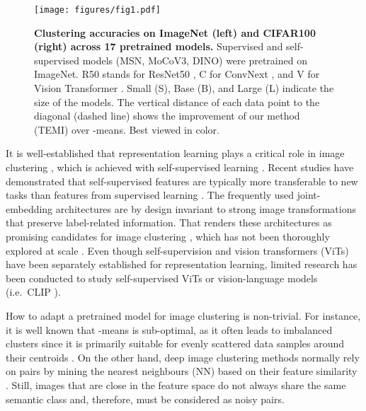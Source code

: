 \documentclass{bmvc2k}
\begin{document}
\begin{figure*}[t]
\begin{center}
\texttt{[image: figures/fig1.pdf]}
\end{center}
\caption{
\textbf{Clustering accuracies on ImageNet (left) and CIFAR100 (right) across 17 pretrained models.} Supervised and self-supervised models (MSN, MoCoV3, DINO) were pretrained on ImageNet. R50 stands for ResNet50 \cite{resnet}, C for ConvNext \cite{convnext}, and V for Vision Transformer \cite{vit}. Small (S), Base (B), and Large (L) indicate the size of the models. The vertical distance of each data point to the diagonal (dashed line) shows the improvement of our method (TEMI) over -means. Best viewed in color.} 
\label{fig:main}
\end{figure*}

 
It is well-established that representation learning plays a critical role in image clustering \cite{chang2017deep}, which is achieved with self-supervised learning \cite{simclr, moco,zbontar2021barlow,byol}. Recent studies have demonstrated that self-supervised features are typically more transferable to new tasks than features from supervised learning \cite{ericsson2021ssltranfer}. The frequently used joint-embedding architectures \cite{byol,dino} are by design invariant to strong image transformations that preserve label-related information. That renders these architectures as promising candidates for image clustering \cite{scan}, which has not been thoroughly explored at scale \cite{tsp}. Even though self-supervision \cite{ericsson2021ssltranfer} and vision transformers (ViTs) \cite{naseer2021intriguing} have been separately established for representation learning, limited research has been conducted to study self-supervised ViTs or vision-language models (i.e.\ CLIP \cite{radford2021clip}).

How to adapt a pretrained model for image clustering is non-trivial. For instance, it is well known that -means is sub-optimal, as it often leads to imbalanced clusters \cite{scan} since it is primarily suitable for evenly scattered data samples around their centroids \cite{yang2017towards}. On the other hand, deep image clustering methods normally rely on pairs by mining the nearest neighbours (NN) based on their feature similarity \cite{dwibedi2021little,huang2019and}. Still, images that are close in the feature space do not always share the same semantic class \cite{scan} and, therefore, must be considered as noisy pairs. 
\end{document}
